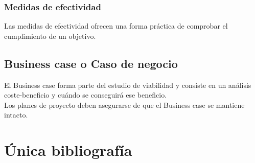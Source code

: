 \documentclass[12pt]{article}
\begin{document}
\subsubsection{Medidas de efectividad}
\label{1.10.2}

{Las medidas de efectividad ofrecen una forma práctica de comprobar el cumplimiento de un objetivo.}

\subsection{Business case o Caso de negocio}
\label{1.11.0}

{El Business case forma parte del estudio de viabilidad y consiste en un análisis coste-beneficio y cuándo se conseguirá ese beneficio.}\\

{Los planes de proyecto deben asegurarse de que el Business case se mantiene intacto.}


\newpage
\section{Única bibliografía}
\nocite{*}
\begingroup
\renewcommand{\section}[2]{}%
\printbibliography
\endgroup
\end{document}
